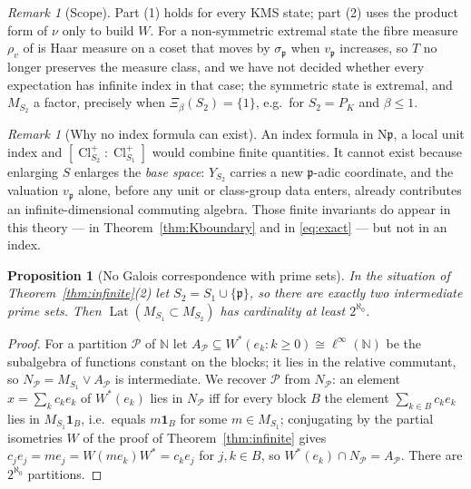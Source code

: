\documentclass[11pt]{amsart}
\numberwithin{equation}{section}
\newtheorem{proposition}[theorem]{Proposition}
\theoremstyle{definition}
\theoremstyle{remark}
\newtheorem{remark}[theorem]{Remark}
\newcommand{\N}{\mathbb{N}}
\newcommand{\pp}{\mathfrak{p}}
\newcommand{\Ns}{\mathrm{N}}
\newcommand{\Cl}{\operatorname{Cl}}
\newcommand{\Lat}{\operatorname{Lat}}
\begin{document}
\begin{remark}[Scope]\label{rem:scope}
Part (1) holds for every KMS state; part (2) uses the product form of $\nu$ only to build
$W$. For a non-symmetric extremal state the fibre measure $\rho_v$ of \cite[Lem.~2.10]{Main}
is Haar measure on a coset that moves by $\sigma_\pp$ when $v_\pp$ increases, so $T$ no
longer preserves the measure class, and we have not decided whether every expectation has
infinite index in that case; the symmetric state is extremal, and $M_{S_2}$ a factor,
precisely when $\Xi_\beta(S_2)=\{1\}$, e.g.\ for $S_2=P_K$ and $\beta\le1$.
\end{remark}

\begin{remark}[Why no index formula can exist]\label{rem:noformula}
An index formula in $\Ns\pp$, a local unit index and $[\Cl^+_{S_2}:\Cl^+_{S_1}]$ would
combine finite quantities. It cannot exist because enlarging $S$ enlarges the \emph{base
space}: $Y_{S_2}$ carries a new $\pp$-adic coordinate, and the valuation $v_\pp$ alone,
before any unit or class-group data enters, already contributes an infinite-dimensional
commuting algebra. Those finite invariants do appear in this theory --- in
Theorem~\ref{thm:Kboundary} and in \eqref{eq:exact} --- but not in an index.
\end{remark}

\begin{proposition}[No Galois correspondence with prime sets]\label{prop:nogalois}
In the situation of Theorem~\ref{thm:infinite}(2) let $S_2=S_1\cup\{\pp\}$, so there are
exactly two intermediate prime sets. Then $\Lat(M_{S_1}\subset M_{S_2})$ has cardinality
at least $2^{\aleph_0}$.
\end{proposition}

\begin{proof}
For a partition $\mathcal P$ of $\N$ let $A_{\mathcal P}\subseteq W^*(e_k:k\ge0)\cong\ell^\infty(\N)$
be the subalgebra of functions constant on the blocks; it lies in the relative commutant, so
$N_{\mathcal P}=M_{S_1}\vee A_{\mathcal P}$ is intermediate. We recover $\mathcal P$ from
$N_{\mathcal P}$: an element $x=\sum_kc_ke_k$ of $W^*(e_k)$ lies in $N_{\mathcal P}$ iff for
every block $B$ the element $\sum_{k\in B}c_ke_k$ lies in $M_{S_1}\mathbf 1_B$, i.e.\ equals
$m\mathbf 1_B$ for some $m\in M_{S_1}$; conjugating by the partial isometries $W$ of the proof
of Theorem~\ref{thm:infinite} gives $c_je_j=me_j=W(me_k)W^*=c_ke_j$ for $j,k\in B$, so
$W^*(e_k)\cap N_{\mathcal P}=A_{\mathcal P}$. There are $2^{\aleph_0}$ partitions.
\end{proof}
\end{document}
